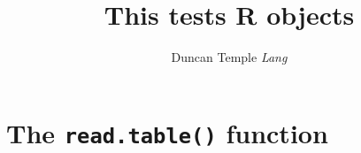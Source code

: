 \documentclass{article}
\title{This tests R \Rfunc{function} objects}
\author{Duncan Temple \textit{Lang}}
\def\Rfunc#1{\textbf{\texttt{#1()}}}
\begin{document}
\maketitle
\tableofcontents
\section{The \Rfunc{read.table} function}
\end{document}

